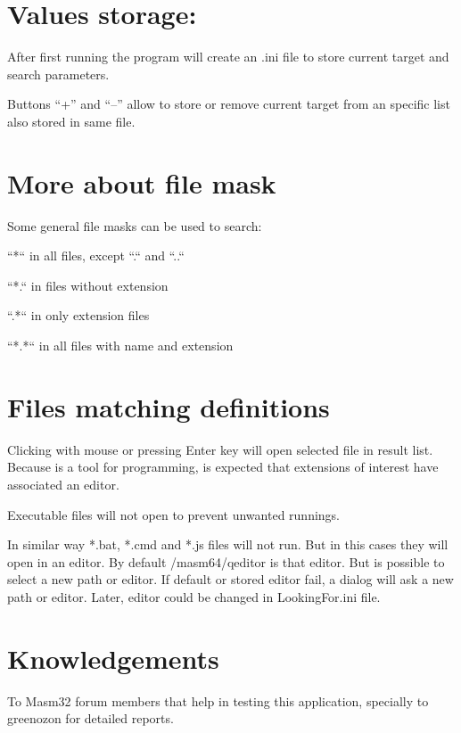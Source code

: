 \documentclass[11pt,a4paper]{scrartcl}
\begin{document}
\section{Values storage: }

	After first running the program will create an .ini file to store current target and search parameters.
	
	Buttons ``+'' and ``--'' allow to store or remove current target from an specific list also stored in same file. 


\section {More about file mask}

	Some general file masks can be used to search:
	
	\hspace{2cm}``*``  in all files, except ``.`` and ``..``
	
	\hspace{2cm}``*.`` in files without extension

	\hspace{2cm}``.*`` in only extension files 

	\hspace{2cm}``*.*`` in all files with name and extension
	
\section {Files matching definitions}
	
	Clicking with mouse or pressing Enter key will open selected file in result list. Because is a tool for programming, is expected that extensions of interest have associated an editor.
	
	Executable files will not open to prevent unwanted runnings. 
	
	In similar way *.bat, *.cmd and *.js files will not run. But in this cases they will open in an editor. By default /masm64/qeditor is that editor. But is possible to select a new path or editor. If default or stored editor fail, a dialog will ask a new path or editor. Later, editor could be changed in LookingFor.ini file.
	
\section{Knowledgements}

	To Masm32 forum members that help in testing this application, specially to greenozon for detailed reports.
\end{document}
